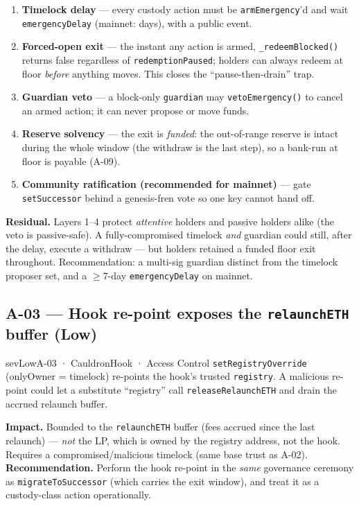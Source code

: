 \documentclass[11pt]{article}
\newcommand{\sev}[2]{\textcolor{#1}{\textbf{#2}}}
\begin{document}
\begin{enumerate}[leftmargin=1.4em]
  \item \textbf{Timelock delay} — every custody action must be \texttt{armEmergency}'d and
        wait \texttt{emergencyDelay} (mainnet: days), with a public event.
  \item \textbf{Forced-open exit} — the instant any action is armed,
        \texttt{\_redeemBlocked()} returns false regardless of \texttt{redemptionPaused};
        holders can always redeem at floor \emph{before} anything moves. This closes the
        ``pause-then-drain'' trap.
  \item \textbf{Guardian veto} — a block-only \texttt{guardian} may
        \texttt{vetoEmergency()} to cancel an armed action; it can never propose or move
        funds.
  \item \textbf{Reserve solvency} — the exit is \emph{funded}: the out-of-range reserve is
        intact during the whole window (the withdraw is the last step), so a bank-run at
        floor is payable (A-09).
  \item \textbf{Community ratification (recommended for mainnet)} — gate
        \texttt{setSuccessor} behind a genesis-fren vote so one key cannot hand off.
\end{enumerate}

\noindent\textbf{Residual.} Layers 1--4 protect \emph{attentive} holders and passive
holders alike (the veto is passive-safe). A fully-compromised timelock \emph{and} guardian
could still, after the delay, execute a withdraw — but holders retained a funded floor
exit throughout. Recommendation: a multi-sig guardian distinct from the timelock proposer
set, and a $\geq$7-day \texttt{emergencyDelay} on mainnet.

\subsection{A-03 --- Hook re-point exposes the \texttt{relaunchETH} buffer \sev{sevLow}{(Low)}}
\begin{finding}{sevLow}{A-03 · CauldronHook · Access Control}
\texttt{setRegistryOverride} (onlyOwner = timelock) re-points the hook's trusted
\texttt{registry}. A malicious re-point could let a substitute ``registry'' call
\texttt{releaseRelaunchETH} and drain the accrued relaunch buffer.
\end{finding}

\noindent\textbf{Impact.} Bounded to the \texttt{relaunchETH} buffer (fees accrued since
the last relaunch) — \emph{not} the LP, which is owned by the registry address, not the
hook. Requires a compromised/malicious timelock (same base trust as A-02).
\textbf{Recommendation.} Perform the hook re-point in the \emph{same} governance ceremony
as \texttt{migrateToSuccessor} (which carries the exit window), and treat it as a
custody-class action operationally.
\end{document}

